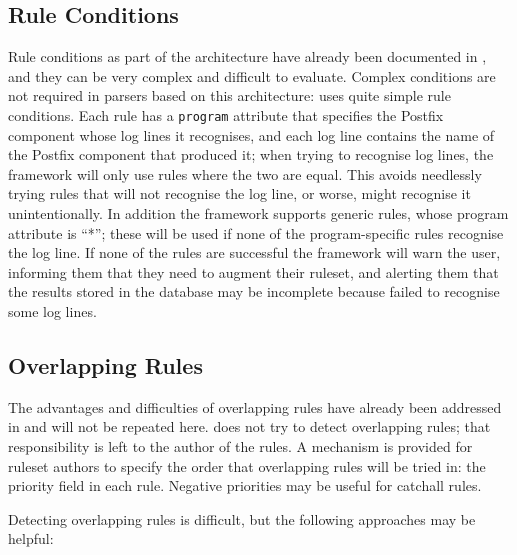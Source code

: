 \subsection{Rule Conditions}

\label{rule conditions in implementation}

Rule conditions as part of the architecture have already been documented in
, and they can be very complex
and difficult to evaluate.  Complex conditions are not required in parsers
based on this architecture: \parsername{} uses quite simple
rule conditions.  Each rule has a \texttt{program} attribute that specifies
the Postfix component whose log lines it recognises, and each log line
contains the name of the Postfix component that produced it; when trying to
recognise log lines, the framework will only use rules where the two are
equal.  This avoids needlessly trying rules that will not recognise the log
line, or worse, might recognise it unintentionally.  In addition the
framework supports generic rules, whose program attribute is ``*''; these
will be used if none of the program-specific rules recognise the log line.
If none of the rules are successful the framework will warn the user,
informing them that they need to augment their ruleset, and alerting them
that the results stored in the database may be incomplete because
\parsername{} failed to recognise some log lines.

\subsection{Overlapping Rules}

\label{overlapping rules in implementation}

The advantages and difficulties of overlapping rules have already been
addressed in  and will not be
repeated here.  \parsername{} does not try to detect overlapping rules;
that responsibility is left to the author of the rules.  A mechanism is
provided for ruleset authors to specify the order that overlapping rules
will be tried in: the priority field in each rule.  Negative priorities may
be useful for catchall rules.

Detecting overlapping rules is difficult, but the following approaches may
be helpful:

